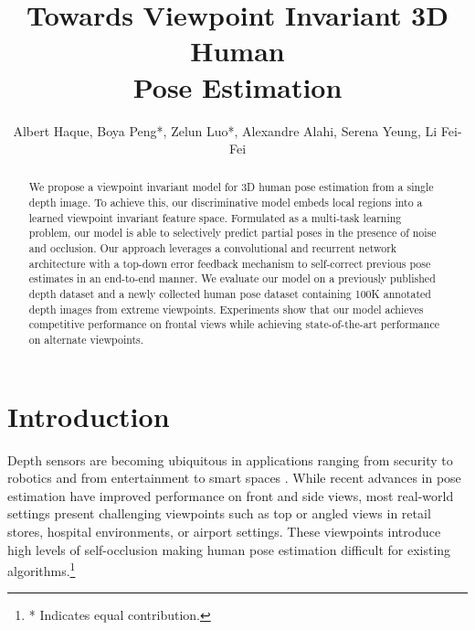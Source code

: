 \documentclass[runningheads]{llncs}
\begin{document}
\pagestyle{headings}
\mainmatter

\title{Towards Viewpoint Invariant 3D Human\\ Pose Estimation} 



\author{{\small Albert Haque, Boya Peng*, Zelun Luo*, Alexandre Alahi, Serena Yeung, Li Fei-Fei}}


\normalfont

\maketitle

\begin{abstract}
We propose a viewpoint invariant model for 3D human pose estimation from a single depth image. To achieve this, our discriminative model embeds local regions into a learned viewpoint invariant feature space. Formulated as a multi-task learning problem, our model is able to selectively predict partial poses in the presence of noise and occlusion. Our approach leverages a convolutional and recurrent network architecture with a top-down error feedback mechanism to self-correct previous pose estimates in an end-to-end manner. We evaluate our model on a previously published depth dataset and a newly collected human pose dataset containing 100K annotated depth images from extreme viewpoints. Experiments show that our model achieves competitive performance on frontal views while achieving state-of-the-art performance on alternate viewpoints.
\end{abstract}

	\section{Introduction}\label{sec:intro}

	Depth sensors are becoming ubiquitous in applications ranging from security to robotics and from entertainment to smart spaces \cite{alahi2014socially}. While recent advances in pose estimation have improved performance on front and side views, most real-world settings present challenging viewpoints such as top or angled views in retail stores, hospital environments, or airport settings. These viewpoints introduce high levels of self-occlusion making human pose estimation difficult for existing algorithms.{\let\thefootnote\relax\footnote{* Indicates equal contribution.}}
\end{document}
